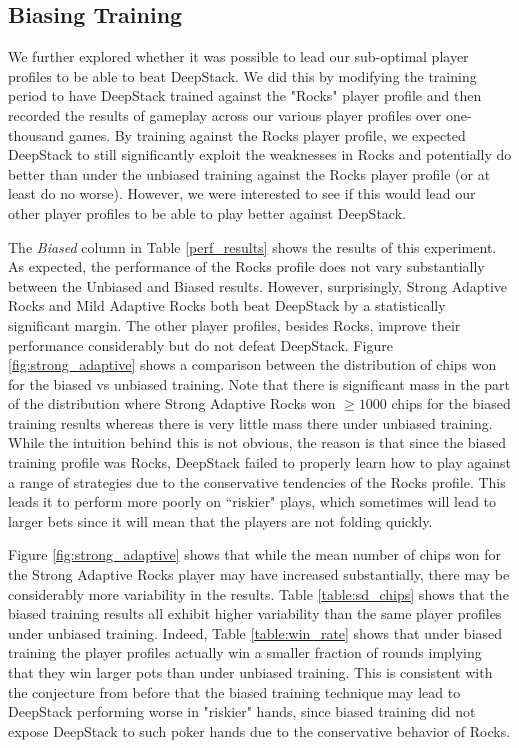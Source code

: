 \documentclass{article}
\begin{document}
\subsection{Biasing Training}

\indent We further explored whether it was possible to lead our sub-optimal player profiles to be able to beat DeepStack. We did this by modifying the training period to have DeepStack trained against the "Rocks" player profile and then recorded the results of gameplay across our various player profiles over one-thousand games. By training against the Rocks player profile, we expected DeepStack to still significantly exploit the weaknesses in Rocks and potentially do better than under the unbiased training against the Rocks player profile (or at least do no worse). However, we were interested to see if this would lead our other player profiles to be able to play better against DeepStack.

\indent The \textit{Biased} column in Table \ref{perf_results} shows the results of this experiment. As expected, the performance of the Rocks profile does not vary substantially between the Unbiased and Biased results. However, surprisingly, Strong Adaptive Rocks and Mild Adaptive Rocks both beat DeepStack by a statistically significant margin. The other player profiles, besides Rocks, improve their performance considerably but do not defeat DeepStack. Figure \ref{fig:strong_adaptive} shows a comparison between the distribution of chips won for the biased vs unbiased training. Note that there is significant mass in the part of the distribution where Strong Adaptive Rocks won $\geq1000$ chips for the biased training results whereas there is very little mass there under unbiased training. While the intuition behind this is not obvious, the reason is that since the biased training profile was Rocks, DeepStack failed to properly learn how to play against a range of strategies due to the conservative tendencies of the Rocks profile. This leads it to perform more poorly on ``riskier" plays, which sometimes will lead to larger bets since it will mean that the players are not folding quickly.

\indent Figure \ref{fig:strong_adaptive} shows that while the mean number of chips won for the Strong Adaptive Rocks player may have increased substantially, there may be considerably more variability in the results. Table \ref{table:sd_chips} shows that the biased training results all exhibit higher variability than the same player profiles under unbiased training. Indeed, Table \ref{table:win_rate} shows that under biased training the player profiles actually win a smaller fraction of rounds implying that they win larger pots than under unbiased training. This is consistent with the conjecture from before that the biased training technique may lead to DeepStack performing worse in "riskier" hands, since biased training did not expose DeepStack to such poker hands due to the conservative behavior of Rocks.
\end{document}
